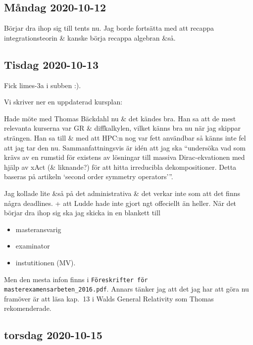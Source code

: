 \subsection{Måndag 2020-10-12}

Börjar dra ihop sig till tents nu. Jag borde fortsätta med att recappa integrationsteorin \& kanske börja recappa algebran \&så.


\subsection{Tisdag 2020-10-13}

Fick limes-3a i subben :).

Vi skriver ner en uppdaterad kursplan:


\bigskip

Hade möte med Thomas Bäckdahl nu \& det kändes bra.
Han sa att de mest relevanta kurserna var GR \& diffkalkylen, vilket känns bra nu när jag skippar strängen.
Han sa till \& med att HPC:n nog var fett användbar så känns inte fel att jag tar den nu.
Sammanfattningsvis är idén att jag ska \enquote{undersöka vad som krävs av en rumstid för existens av lösningar till massiva Dirac-ekvationen med hjälp av xAct (\& liknande?) för att hitta irreducibla dekompositioner. Detta baseras på artikeln \enquote{second order symmetry operators}}.

Jag kollade lite \&så på det administrativa \& det verkar inte som att det finns några deadlines. + att Ludde hade inte gjort ngt offeciellt än heller. När det börjar dra ihop sig ska jag skicka in en blankett till
\begin{itemize}
	\item masteransvarig
	\item examinator
	\item instutitionen (MV).
\end{itemize}
Men den mesta infon finns i \verb|Föreskrifter för masterexamensarbeten_2016.pdf|. Annars tänker jag att det jag har att göra nu framöver är att läsa kap.\ 13 i Walds General Relativity som Thomas rekomenderade.


\subsection{torsdag 2020-10-15}

